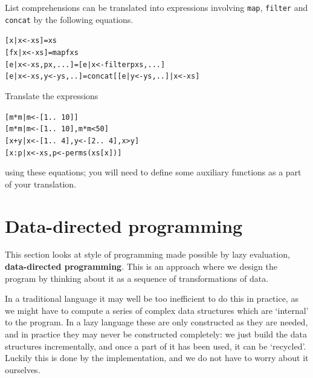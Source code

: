 \begin{exercises}
\item
List comprehensions can be translated into expressions involving \texttt{map},
\texttt{filter} and \texttt{concat} by the following equations.
\begin{alltt}
[ x | x<-xs ]              = xs
[ f x | x<-xs ]            = map f xs
[ e | x<-xs , p x , ... ]  = [ e | x <- filter p xs , ... ]
[ e | x<-xs , y<-ys , .. ] = concat [ [e|y<-ys, ..] | x<-xs]
\end{alltt}
Translate the expressions
\begin{alltt}
[ m*m | m <- [1 ..\ 10] ]
[ m*m | m <- [1 ..\ 10] , m*m<50 ]
[ x+y | x <- [1 ..\ 4] , y <- [2 ..\ 4] , x>y ]
[ x:p | x <- xs , p <- perms (xs\bs{}\bs{}[x]) ]
\end{alltt}
using these equations; you will need to define some auxiliary functions as a
part of your translation.


\end{exercises}


\section{Data-directed programming}

This section looks at style of programming made possible by lazy evaluation,
\textbf{data-directed programming}. This is an approach where we design the program by thinking about it as a sequence of transformations of data.  

In a traditional language it may well be too inefficient to do this in practice, as we might have to compute a series of complex data structures which are `internal' to the program. In a lazy language these are only constructed as they are needed, and in practice they may never be constructed completely: we just build the data structures incrementally, and once a part of it has been used, it can be `recycled'. Luckily this is done by the implementation, and we do not have to worry about it ourselves. 


